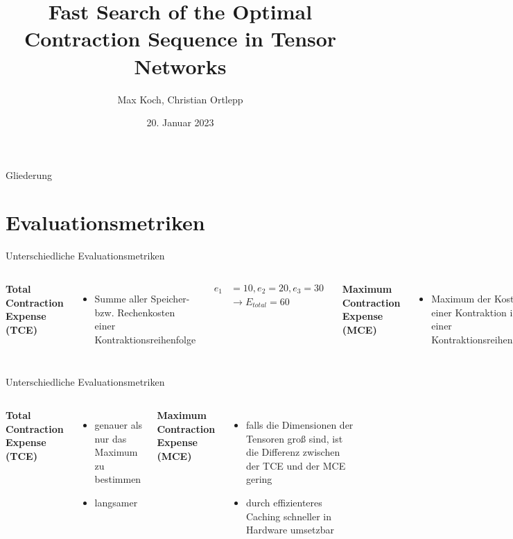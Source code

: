 \documentclass{beamer}
\title{Fast Search of the Optimal Contraction Sequence in Tensor Networks\cite{9325533}}
\author{Max Koch, Christian Ortlepp}
\institute{Friedrich-Schiller-Universität Jena}
\date{20. Januar 2023}
\begin{document}
	
	\maketitle 
	\begin{frame}{Gliederung}
		\tableofcontents
	\end{frame}
	
	\section{Evaluationsmetriken}
		\begin{frame}{Unterschiedliche Evaluationsmetriken}
			\begin{columns}[]

					\textbf{Total Contraction Expense (TCE)}
					\begin{itemize}
						\item Summe aller Speicher- bzw. Rechenkosten einer Kontraktionsreihenfolge
					\end{itemize}
					\begin{align*}
						e_1 &= 10, e_2 = 20, e_3 = 30 \\
						&\rightarrow E_{total} = 60
					\end{align*}


					\textbf{Maximum Contraction Expense (MCE)}
					\begin{itemize}
						\item Maximum der Kosten einer Kontraktion in einer Kontraktionsreihenfolge
					\end{itemize}
					\begin{align*}
						e_1 &= 10, e_2 = 20, e_3 = 30 \\
						&\rightarrow E_{max} = 30
					\end{align*}
			\end{columns}
		\end{frame}

		\begin{frame}{Unterschiedliche Evaluationsmetriken}
			\begin{columns}	
						\textbf{Total Contraction Expense (TCE)}
						\begin{itemize}
							\item genauer als nur das Maximum zu bestimmen
							\item langsamer
						\end{itemize}


					\textbf{Maximum Contraction Expense (MCE)}
					\begin{itemize}
						\item falls die Dimensionen der Tensoren groß sind, ist die Differenz zwischen der TCE und der MCE gering
						\item durch effizienteres Caching schneller in Hardware umsetzbar
					\end{itemize}

			\end{columns}
		\end{frame}
\end{document}
